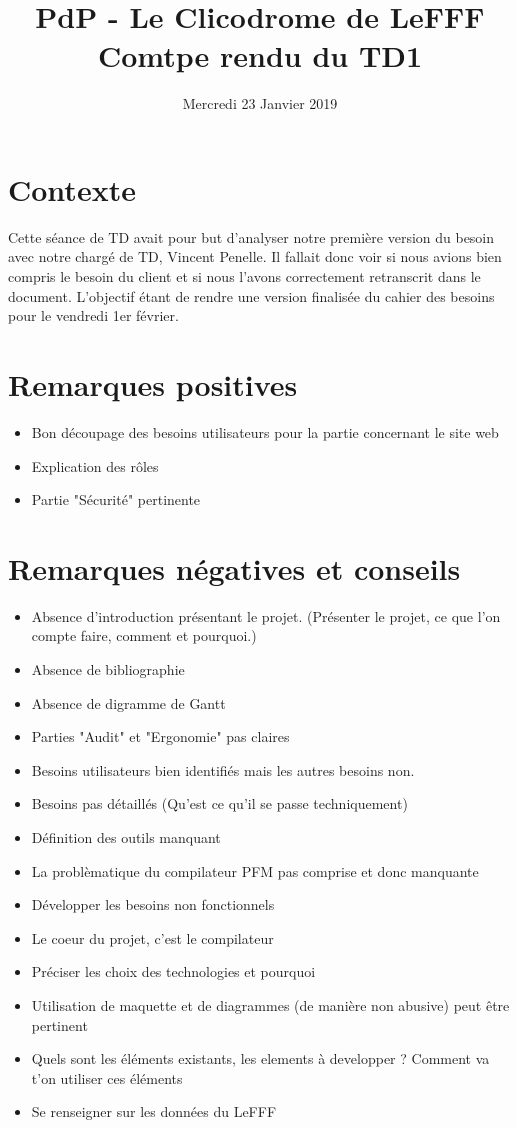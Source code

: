 \documentclass{article}
\title{PdP - Le Clicodrome de LeFFF \\ Comtpe rendu du TD1}
\author{}
\date{Mercredi 23 Janvier 2019}
\begin{document}
\maketitle

\section{Contexte}
Cette séance de TD avait pour but d'analyser notre première version du besoin avec notre chargé de TD, Vincent Penelle. Il fallait donc voir si nous avions bien compris le besoin du client et si nous l'avons correctement retranscrit dans le document.
L'objectif étant de rendre une version finalisée du cahier des besoins pour le vendredi 1er février.


\section{Remarques positives}
\begin{itemize}
    \item Bon découpage des besoins utilisateurs pour la partie concernant le site web
    \item Explication des rôles 
    \item Partie "Sécurité" pertinente
\end{itemize}

\section{Remarques négatives et conseils}
\begin{itemize}
    \item Absence d'introduction présentant le projet. (Présenter le projet, ce que l'on compte faire, comment et pourquoi.)
    \item Absence de bibliographie
    \item Absence de digramme de Gantt
    \item Parties "Audit" et "Ergonomie" pas claires
    \item Besoins utilisateurs bien identifiés mais les autres besoins non.
    \item Besoins pas détaillés (Qu'est ce qu'il se passe techniquement)
    \item Définition des outils manquant
    \item La problèmatique du compilateur PFM pas comprise et donc manquante
    \item Développer les besoins non fonctionnels
    \item Le coeur du projet, c'est le compilateur
    \item Préciser les choix des technologies et pourquoi
    \item Utilisation de maquette et de diagrammes (de manière non abusive) peut être pertinent
    \item Quels sont les éléments existants, les elements à developper ? Comment va t'on utiliser ces éléments
    \item Se renseigner sur les données du LeFFF
\end{itemize}
\end{document}
